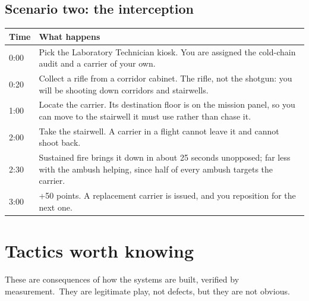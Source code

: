 \subsection{Scenario two: the interception}
\begin{center}
\begin{tabular}{@{}p{}p{}@{}}
\toprule
\textbf{Time} & \textbf{What happens} \\
\midrule
0:00 & Pick the Laboratory Technician kiosk. You are assigned the cold-chain audit and a carrier of your own. \\
0:20 & Collect a rifle from a corridor cabinet. The rifle, not the shotgun: you will be shooting down corridors and stairwells. \\
1:00 & Locate the carrier. Its destination floor is on the mission panel, so you can move to the stairwell it must use rather than chase it. \\
2:00 & Take the stairwell. A carrier in a flight cannot leave it and cannot shoot back. \\
2:30 & Sustained fire brings it down in about 25 seconds unopposed; far less with the ambush helping, since half of every ambush targets the carrier. \\
3:00 & +50 points. A replacement carrier is issued, and you reposition for the next one. \\
\bottomrule
\end{tabular}
\end{center}

\section{Tactics worth knowing}
These are consequences of how the systems are built, verified by measurement.\
They are legitimate play, not defects, but they are not obvious.\

